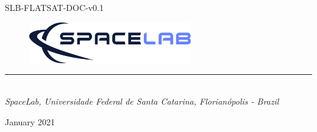 %
%
%
%
%

%
%
%
%
%
%

\begin{titlepage}

\thispagestyle{empty}

\begin{flushleft}
SLB-FLATSAT-DOC-v0.1
\end{flushleft}

\vspace{1cm}

\begin{figure}[!ht]
    \begin{flushleft}
        \includegraphics[width=7cm]{figures/spacelab_logo_full_color_rgb_1000px_72ppi.png}
    \end{flushleft}
\end{figure}

\begin{flushleft}
\Huge{\textbf{\thetitle}}
\rule[0pt]{\textwidth}{5pt}
\end{flushleft}

\vspace{0.2cm}

\begin{flushleft}
\textit{\thetitle} \\
\textit{SpaceLab, Universidade Federal de Santa Catarina, Florianópolis - Brazil}
\end{flushleft}

\vfill
\vfill

\begin{flushright}
January 2021
\end{flushright}

\end{titlepage}
